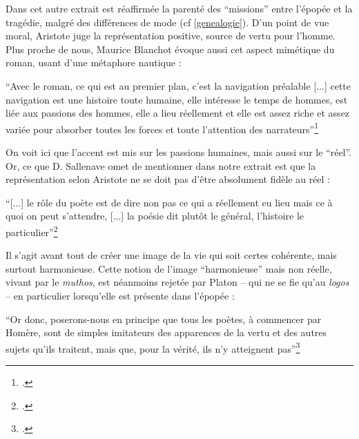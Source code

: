 \documentclass[a4paper,10pt]{article}
\begin{document}
				Dans cet autre extrait est réaffirmée la parenté des ``missions'' entre l'épopée et la tragédie, malgré des différences de mode (cf \ref{genealogie}). D'un point de vue moral, Aristote juge la représentation positive, source de vertu pour l'homme.\\
				Plus proche de nous, Maurice Blanchot évoque aussi cet aspect mimétique du roman, usant d'une métaphore nautique :
				\begin{center}
					\footnotesize
					\begin{minipage}{0.7\textwidth}
						``Avec le roman, ce qui est au premier plan, c'est la navigation préalable [...] cette navigation est une histoire toute humaine, elle intéresse le temps de hommes, est liée aux passions des hommes, elle a lieu réellement et elle est assez riche et assez variée pour absorber toutes les forces et toute l'attention des narrateurs''\footcite{Blanchot1959}
					\end{minipage}
				\end{center}
				On voit ici que l'accent est mis sur les passions humaines, mais aussi sur le ``réel''.\\
				Or, ce que D. Sallenave omet de mentionner dans notre extrait est que la représentation selon Aristote ne se doit pas d'être absolument fidèle au réel :
				\begin{center}
					\footnotesize
					\begin{minipage}{0.7\textwidth}
						``[...] le rôle du poète est de dire non pas ce qui a réellement eu lieu mais ce à quoi on peut s’attendre, [...]  la poésie dit plutôt le général, l’histoire le particulier''\footcite[chap.~IX]{Aristote}
					\end{minipage}
				\end{center}
				Il s'agit avant tout de créer une image de la vie qui soit certes cohérente, mais surtout harmonieuse. Cette notion de l'image ``harmonieuse'' mais non réelle, vivant par le \textit{muthos}, est néanmoins rejetée par Platon -- qui ne se fie qu'au \textit{logos} -- en particulier lorsqu'elle est présente dans l'épopée :
				\begin{center}
					\footnotesize
					\begin{minipage}{0.7\textwidth}
						``Or donc, poserons-nous en principe que tous les poètes, à commencer par Homère, sont de simples imitateurs
						des apparences de la vertu et des autres sujets qu’ils traitent, mais que, pour la vérité, ils n’y atteignent pas''\footcite[Livre~X]{Platon}
					\end{minipage}
				\end{center}
\end{document}
